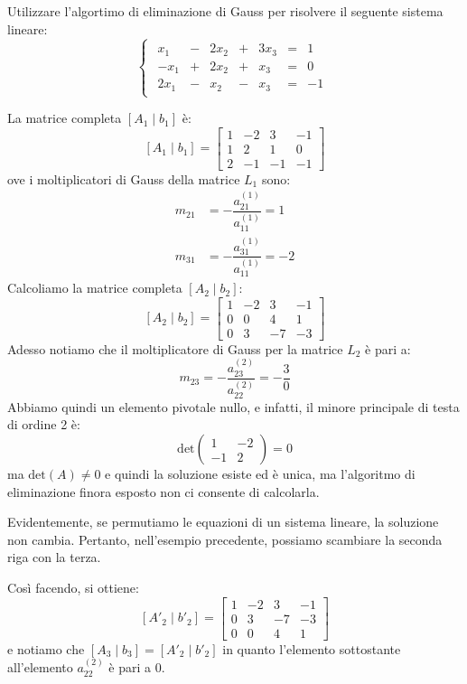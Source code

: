 \documentclass[12pt]{report}
\newcounter{exercise}
\begin{document}
\begin{exercise}{}{}
\begin{assignment}{}{}
Utilizzare l'algortimo di eliminazione di Gauss per risolvere il seguente sistema lineare:
\[
\begin{cases}
\begin{array}{rcrcrcr}
  x_1 & - & 2x_2 & +  & 3x_3 & = & 1 \\
 -x_1 & + & 2x_2 & + & x_3 &  = &  0 \\
 2x_1 & - & x_2 &  - & x_3     & = &  -1
\end{array}
\end{cases}
\]
\end{assignment}
La matrice completa $[A_1 \mid b_1]$ è:
\[
[A_1 \mid b_1] = \left[
\begin{array}{ccc|r}
  1 & -2 & 3  & -1 \\
  1 & 2 & 1  & 0 \\
  2 & -1 & -1 &  -1
\end{array}
\right]
\]
ove i moltiplicatori di Gauss della matrice $L_1$ sono:
\begin{align*}
	m_{21} &= -\dfrac{a^{(1)}_{21}}{a^{(1)}_{11}} = 1 \\
	m_{31} &= -\dfrac{a^{(1)}_{31}}{a^{(1)}_{11}} = -2
\end{align*}
Calcoliamo la matrice completa $[A_2 \mid b_2]$:
\[
[A_2 \mid b_2] = \left[
\begin{array}{ccc|r}
  1 & -2 & 3  & -1 \\
  0 & 0 & 4  & 1 \\
  0 & 3 & -7 &  -3
\end{array}
\right]
\]
Adesso notiamo che il moltiplicatore di Gauss per la matrice $L_2$ è pari a:
\[
m_{23} = -\dfrac{a^{(2)}_{23}}{a^{(2)}_{22}} = -\dfrac{3}{0}
\]
Abbiamo quindi un elemento pivotale nullo, e infatti, il minore principale di testa di ordine 2 è:
\[
\text{det}\begin{pmatrix}
	1 & -2 \\
	-1 & 2
\end{pmatrix} = 0
\]
ma $\text{det}(A) \neq 0$ e quindi la soluzione esiste ed è unica, ma l'algoritmo di eliminazione finora esposto non ci consente di calcolarla.
\begin{note}{}{}
Evidentemente, se permutiamo le equazioni di un sistema lineare, la soluzione non cambia. Pertanto, nell'esempio precedente, possiamo scambiare la seconda riga con la terza.
\end{note}
Così facendo, si ottiene:
\[
[A'_2 \mid b'_2] = \left[
\begin{array}{ccc|r}
  1 & -2 & 3  & -1 \\
  0 & 3 & -7  & -3 \\
  0 & 0 & 4 &  1
\end{array}
\right]
\]
e notiamo che $[A_3 \mid b_3] = [A'_2 \mid b'_2]$ in quanto l'elemento sottostante all'elemento $a^{(2)}_{22}$ è pari a 0.


\end{exercise}
\end{document}
